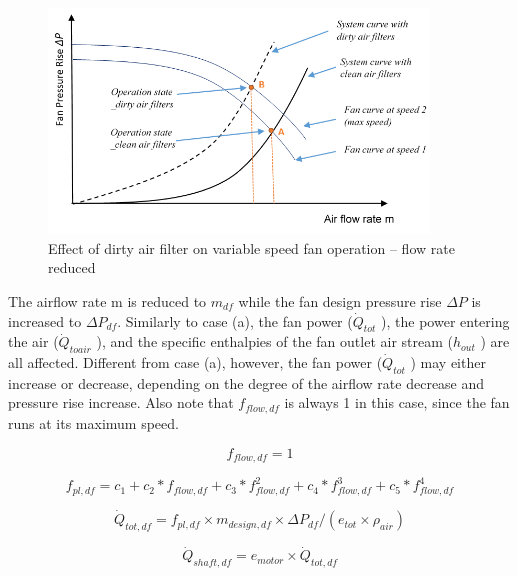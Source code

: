 \begin{figure}[hbtp] %
\centering
\includegraphics[width=0.9\textwidth, height=0.9\textheight, keepaspectratio=true]{media/image8007.png}
\caption{Effect of dirty air filter on variable speed fan operation – flow rate reduced \protect \label{fig:effect-of-dirty-air-filter-on-variable-speed-001}}
\end{figure}

The airflow rate m is reduced to \(m_{df}\) while the fan design pressure rise \(\Delta P\) is increased to \(\Delta P_{df}\). Similarly to case (a), the fan power (\(\dot Q_{tot}\) ), the power entering the air (\(\dot Q_{toair}\) ), and the specific enthalpies of the fan outlet air stream (\(h_{out}\) ) are all affected. Different from case (a), however, the fan power (\(\dot Q_{tot}\) ) may either increase or decrease, depending on the degree of the airflow rate decrease and pressure rise increase. Also note that \(f_{flow,df}\) is always 1 in this case, since the fan runs at its maximum speed.

\begin{equation}
f_{flow,df} = 1
\end{equation}

\begin{equation}
f_{pl,df} = c_{1} + c_{2}*f_{flow,df} + c_{3}*f_{flow,df}^2 + c_{4}*f_{flow,df}^3 + c_{5}*f_{flow,df}^4
\end{equation}

\begin{equation}
\dot{Q}_{tot,df} = f_{pl,df} \times m_{design,df} \times \Delta P_{df} / (e_{tot} \times \rho_{air} )
\end{equation}

\begin{equation}
\dot{Q}_{shaft,df} = e_{motor} \times \dot{Q}_{tot, df}
\end{equation}

